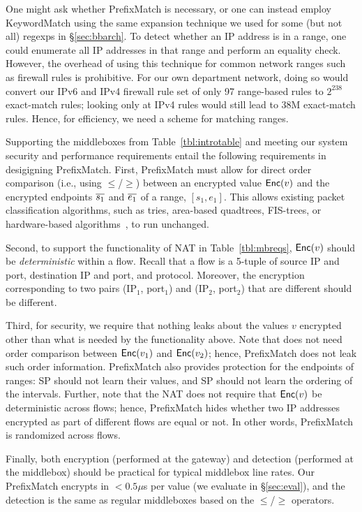 One might ask whether PrefixMatch is necessary, or one can instead employ KeywordMatch using the same expansion technique we used for some (but not all) regexps in \S\ref{sec:bbarch}. 
To detect whether an IP address is in a range, one could enumerate all IP addresses in that range and perform an equality check. However, the overhead of using this technique for common network ranges such as firewall rules is prohibitive.
For our own department network, doing so would convert our IPv6 and IPv4 firewall rule set of only 97 range-based rules to $2^{238}$ exact-match  rules; looking only at IPv4 rules would still lead to 38M exact-match rules.
Hence, for efficiency, we need a scheme for matching ranges.

%
Supporting the middleboxes from Table~\ref{tbl:introtable} and meeting our system security and performance requirements entail the following requirements in desigigning PrefixMatch.
%
First, PrefixMatch must allow for direct order comparison (i.e., using $\leq$/$\geq$) between an encrypted value $\mathsf{Enc}(v)$ and the encrypted endpoints $\overline{s_1}$ and $\overline{e_1}$ of a range, $[s_1, e_1]$. This allows existing packet classification algorithms, such as tries, area-based quadtrees, FIS-trees, or hardware-based algorithms~\cite{packet_classif}, 
 to run unchanged. 

Second, to support the functionality of NAT in Table~\ref{tbl:mbreqs}, $\mathsf{Enc}(v)$ should be {\em deterministic} within a flow. Recall that a flow is a 5-tuple of source IP and port, destination IP and port, and protocol. Moreover, the encryption corresponding to two pairs (IP$_1$, port$_1$) and  (IP$_2$, port$_2$) that are different should be different.

Third, for security, we require that nothing leaks about the values $v$ encrypted other than what is needed by the functionality above. Note that \sys does not need order comparison between $\mathsf{Enc}(v_1)$ and $\mathsf{Enc}(v_2)$; hence, PrefixMatch does not leak such order information.  PrefixMatch also provides protection for the endpoints of ranges: SP should not learn their values, and SP should not learn the ordering of the intervals. 
 Further, note that the NAT does not require that $\mathsf{Enc}(v)$ be deterministic across flows; hence, PrefixMatch hides whether two IP addresses encrypted as part of different flows are equal or not. In other words, PrefixMatch is randomized across flows.
 
Finally, both encryption (performed at the gateway) and detection (performed at the middlebox) should be practical for typical middlebox line rates.
Our PrefixMatch encrypts in $< 0.5\mu$s per value (we evaluate in \S\ref{sec:eval}), and the detection is the same as regular middleboxes based on the $\leq$/$\geq$ operators.

